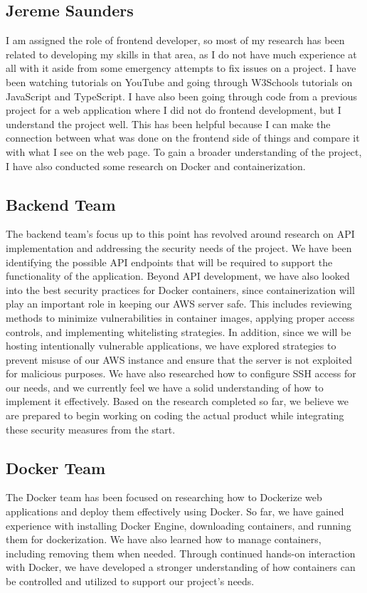 \documentclass[12pt]{article}
\begin{document}
\subsection{Jereme Saunders}
I am assigned the role of frontend developer, so most of my research has been related to developing my skills in that area, as I do not have much experience at all with it aside from some emergency attempts to fix issues on a project. I have been watching tutorials on YouTube and going through W3Schools tutorials on JavaScript and TypeScript.  I have also been going through code from a previous project for a web application where I did not do frontend development, but I understand the project well. This has been helpful because I can make the connection between what was done on the frontend side of things and compare it with what I see on the web page. To gain a broader understanding of the project, I have also conducted some research on Docker and containerization.

\subsection{Backend Team}
The backend team’s focus up to this point has revolved around research on API implementation and addressing the security needs of the project. We have been identifying the possible API endpoints that will be required to support the functionality of the application. Beyond API development, we have also looked into the best security practices for Docker containers, since containerization will play an important role in keeping our AWS server safe. This includes reviewing methods to minimize vulnerabilities in container images, applying proper access controls, and implementing whitelisting strategies. In addition, since we will be hosting intentionally vulnerable applications, we have explored strategies to prevent misuse of our AWS instance and ensure that the server is not exploited for malicious purposes. We have also researched how to configure SSH access for our needs, and we currently feel we have a solid understanding of how to implement it effectively. Based on the research completed so far, we believe we are prepared to begin working on coding the actual product while integrating these security measures from the start.

\subsection{Docker Team}
The Docker team has been focused on researching how to Dockerize web applications and deploy them effectively using Docker. So far, we have gained experience with installing Docker Engine, downloading containers, and running them for dockerization. We have also learned how to manage containers, including removing them when needed. Through continued hands-on interaction with Docker, we have developed a stronger understanding of how containers can be controlled and utilized to support our project’s needs.
\end{document}
